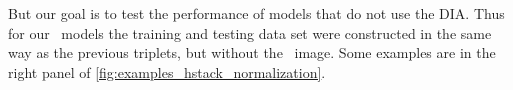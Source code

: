 But our goal is to test the performance of models that do not use the DIA. Thus for our \nodia\ models the training and testing data set were constructed in the same way as the previous triplets, but without the \diff\ image. Some examples are in the right panel of \autoref{fig:examples_hstack_normalization}.




